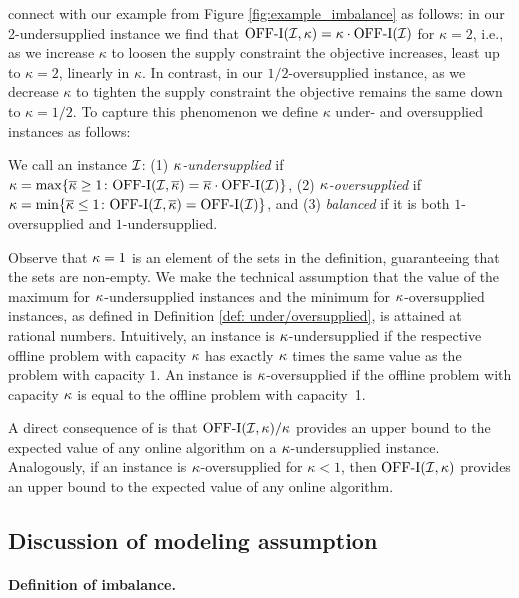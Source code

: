 connect with our example from Figure \ref{fig:example_imbalance} as follows: in our 2-undersupplied instance we find that $\mathrm{\mathrm{OFF}}\textrm{-}\mathrm{I}(\mathcal I,\kappa)=\kappa \cdot \mathrm{\mathrm{OFF}}\textrm{-}\mathrm{I}(\mathcal I)$ for $\kappa=2$, i.e., as we increase $\kappa$ to loosen the supply constraint the objective increases, least up to $\kappa=2$, linearly in $\kappa$. In contrast, in our $1/2$-oversupplied instance, as we decrease $\kappa$ to tighten the supply constraint the objective remains the same down to $\kappa=1/2$. To capture this phenomenon we define $\kappa$ under- and oversupplied instances as follows: 
\begin{definition} \label{def: under/oversupplied}
We call an instance $\mathcal I$: 
(1) \textit{$\kappa$-undersupplied} if $\kappa = \max\{ \overline{\kappa} \geq 1 \colon \mathrm{\mathrm{OFF}}\textrm{-}\mathrm{I}(\mathcal I, \overline{\kappa}) = \overline{\kappa} \cdot \mathrm{\mathrm{OFF}}\textrm{-}\mathrm{I}(\mathcal I)\}$, (2) \textit{$\kappa$-oversupplied} if $
            \kappa = \min\{ \overline{\kappa} \leq 1 \colon \mathrm{\mathrm{OFF}}\textrm{-}\mathrm{I}(\mathcal I,\overline{\kappa}) = \mathrm{\mathrm{OFF}}\textrm{-}\mathrm{I}(\mathcal I)\}$, and (3) 
         \textit{balanced} if it is both $1$-oversupplied and $1$-undersupplied.
    \end{definition}
Observe that $\kappa=1$ is an element of the sets in the definition, guaranteeing that the sets are non-empty. We make the technical assumption that the value of the maximum for $\kappa$-undersupplied instances and the minimum for $\kappa$-oversupplied instances, as defined in Definition \ref{def: under/oversupplied}, is attained at rational numbers. Intuitively, an instance is $\kappa$-undersupplied if the respective offline problem with capacity $\kappa$ has exactly $\kappa$ times the same value as the problem with capacity $1$. An instance is $\kappa$-oversupplied if the offline problem with capacity $\kappa$ is equal to the offline problem with capacity~1.

A direct consequence of  is that $\mathrm{\mathrm{OFF}}\textrm{-}\mathrm{I}(\mathcal I,\kappa)/\kappa$ provides an upper bound to the expected value of any online algorithm on a $\kappa$-undersupplied instance. Analogously, if an instance is $\kappa$-oversupplied for $\kappa < 1$, then $\mathrm{\mathrm{OFF}}\textrm{-}\mathrm{I}(\mathcal I,\kappa)$ provides an upper bound to the expected value of any online algorithm.

\subsection*{Discussion of modeling assumption}

\paragraph{Definition of imbalance.}

